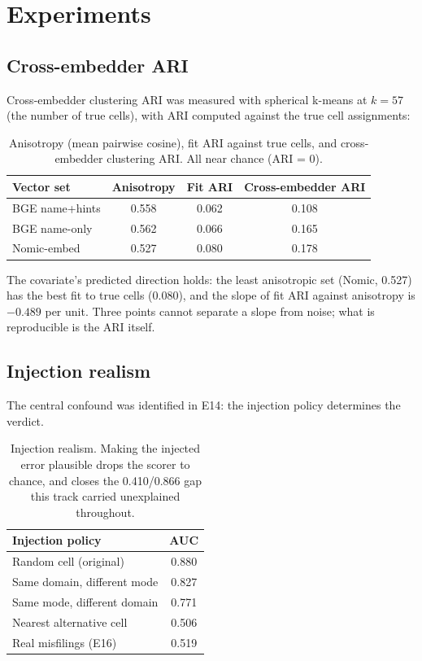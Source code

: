 \documentclass[11pt]{article}
\begin{document}
\section{Experiments}

\subsection{Cross-embedder ARI}

Cross-embedder clustering ARI was measured with spherical k-means at
$k = 57$ (the number of true cells), with ARI computed against the true
cell assignments:

\begin{table}[h]
\centering
\begin{tabular}{lccc}
\toprule
\textbf{Vector set} & \textbf{Anisotropy} & \textbf{Fit ARI} & \textbf{Cross-embedder ARI} \\
\midrule
BGE name+hints & 0.558 & 0.062 & 0.108 \\
BGE name-only & 0.562 & 0.066 & 0.165 \\
Nomic-embed & 0.527 & 0.080 & 0.178 \\
\bottomrule
\end{tabular}
\caption{Anisotropy (mean pairwise cosine), fit ARI against true cells,
and cross-embedder clustering ARI. All near chance (ARI = 0).}
\label{tab:ari}
\end{table}

The covariate's predicted direction holds: the least anisotropic set
(Nomic, 0.527) has the best fit to true cells (0.080), and the slope of
fit ARI against anisotropy is $-0.489$ per unit. Three points cannot
separate a slope from noise; what is reproducible is the ARI itself.

\subsection{Injection realism}

The central confound was identified in E14: the injection policy
determines the verdict.

\begin{table}[h]
\centering
\begin{tabular}{lc}
\toprule
\textbf{Injection policy} & \textbf{AUC} \\
\midrule
Random cell (original) & 0.880 \\
Same domain, different mode & 0.827 \\
Same mode, different domain & 0.771 \\
Nearest alternative cell & 0.506 \\
Real misfilings (E16) & 0.519 \\
\bottomrule
\end{tabular}
\caption{Injection realism. Making the injected error plausible drops the
scorer to chance, and closes the 0.410/0.866 gap this track carried
unexplained throughout.}
\label{tab:injection}
\end{table}
\end{document}
